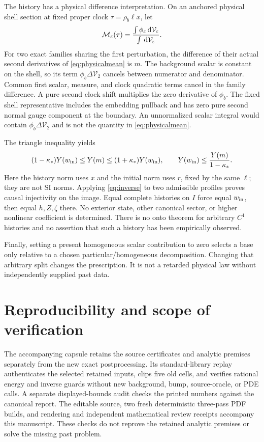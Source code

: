 \documentclass[11pt]{article}
\newcommand{\dd}{\,\mathrm d}
\newcommand{\eps}{\varepsilon}
\newcommand{\calV}{\mathcal V}
\begin{document}
The history has a physical difference interpretation. On an anchored
physical shell section at fixed proper clock $\tau=\rho_b\ell x$, let
\begin{equation}
 {\cal M}_\eps(\tau)=
 \frac{\int\phi_\eps\dd\calV_\eps}{\int\dd\calV_\eps}.
 \label{eq:physicalmean}
\end{equation}
For two exact families sharing the first perturbation, the difference
of their actual second derivatives of \eqref{eq:physicalmean} is $m$.
The background scalar is constant on the shell, so its term
$\phi_b\Delta\calV_2$ cancels between numerator and denominator.
Common first scalar, measure, and clock quadratic terms cancel in the
family difference. A pure second clock shift multiplies the zero
derivative of $\phi_b$. The fixed shell representative includes the
embedding pullback and has zero pure second normal gauge component at
the boundary. An unnormalized scalar integral would contain
$\phi_b\Delta\calV_2$ and is not the quantity in \eqref{eq:physicalmean}.

The triangle inequality yields
\begin{equation}
 (1-\kappa_*)Y(w_{\rm in})\le Y(m)
       \le(1+\kappa_*)Y(w_{\rm in}),\qquad
 Y(w_{\rm in})\le\frac{Y(m)}{1-\kappa_*}.
 \label{eq:inverse}
\end{equation}
Here the history norm uses $x$ and the initial norm uses $r$, fixed by
the same $\ell$; they are not SI norms. Applying \eqref{eq:inverse} to
two admissible profiles proves causal injectivity on the image.
Equal complete histories on $I$ force equal $w_{\rm in}$, then equal
$h,Z,\zeta$ there. No exterior state, other canonical sector, or higher
nonlinear coefficient is determined.
There is no onto theorem for arbitrary $C^1$ histories and no assertion
that such a history has been empirically observed.

Finally, setting a present homogeneous scalar contribution to zero
selects a base only relative to a chosen particular/homogeneous
decomposition. Changing that arbitrary split changes the prescription.
It is not a retarded physical law without independently supplied past
data.

\section{Reproducibility and scope of verification}
The accompanying capsule retains the source certificates and analytic
premises separately from the new exact postprocessing. Its standard-library
replay authenticates the selected retained inputs, clips five old cells,
and verifies rational energy and inverse guards without new background,
bump, source-oracle, or PDE calls. A separate displayed-bounds audit checks
the printed numbers against the canonical report. The editable source,
two fresh deterministic three-pass PDF builds, and rendering and independent
mathematical review receipts accompany this manuscript. These checks do not
reprove the retained analytic premises or solve the missing past problem.
\end{document}
